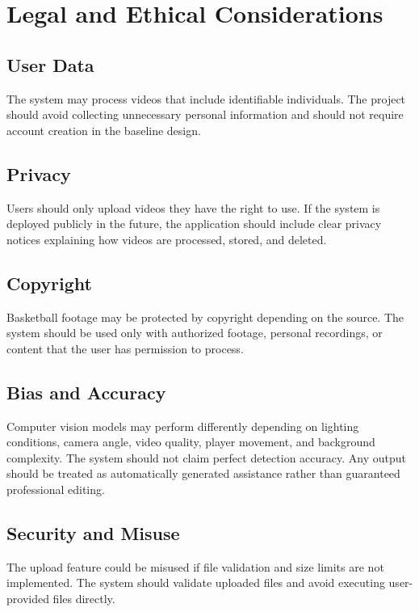 \documentclass[12pt]{article}
\begin{document}
\newpage

\section{Legal and Ethical Considerations}

\subsection{User Data}
The system may process videos that include identifiable individuals. The project should avoid collecting unnecessary personal information and should not require account creation in the baseline design.

\subsection{Privacy}
Users should only upload videos they have the right to use. If the system is deployed publicly in the future, the application should include clear privacy notices explaining how videos are processed, stored, and deleted.

\subsection{Copyright}
Basketball footage may be protected by copyright depending on the source. The system should be used only with authorized footage, personal recordings, or content that the user has permission to process.

\subsection{Bias and Accuracy}
Computer vision models may perform differently depending on lighting conditions, camera angle, video quality, player movement, and background complexity. The system should not claim perfect detection accuracy. Any output should be treated as automatically generated assistance rather than guaranteed professional editing.

\subsection{Security and Misuse}
The upload feature could be misused if file validation and size limits are not implemented. The system should validate uploaded files and avoid executing user-provided files directly.
\end{document}
